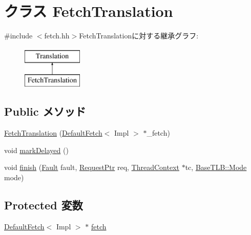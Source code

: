 \hypertarget{classDefaultFetch_1_1FetchTranslation}{
\section{クラス FetchTranslation}
\label{classDefaultFetch_1_1FetchTranslation}
}


{\ttfamily \#include $<$fetch.hh$>$}FetchTranslationに対する継承グラフ:\begin{figure}[H]
\begin{center}
\leavevmode
\includegraphics[height=2cm]{classDefaultFetch_1_1FetchTranslation}
\end{center}
\end{figure}
\subsection*{Public メソッド}
\begin{DoxyCompactItemize}
\item 
\hyperlink{classDefaultFetch_1_1FetchTranslation_a29f6356ec0deaed2e91844473a66b4ed}{FetchTranslation} (\hyperlink{classDefaultFetch}{DefaultFetch}$<$ Impl $>$ $\ast$\_\-fetch)
\item 
void \hyperlink{classDefaultFetch_1_1FetchTranslation_ad1fd11d1e352cfc4b329d29b46a19fc4}{markDelayed} ()
\item 
void \hyperlink{classDefaultFetch_1_1FetchTranslation_a01e7d945def8d2e5df87a169954fa89f}{finish} (\hyperlink{classRefCountingPtr}{Fault} fault, \hyperlink{classRequest}{RequestPtr} req, \hyperlink{classThreadContext}{ThreadContext} $\ast$tc, \hyperlink{classBaseTLB_a46c8a310cf4c094f8c80e1cb8dc1f911}{BaseTLB::Mode} mode)
\end{DoxyCompactItemize}
\subsection*{Protected 変数}
\begin{DoxyCompactItemize}
\item 
\hyperlink{classDefaultFetch}{DefaultFetch}$<$ Impl $>$ $\ast$ \hyperlink{classDefaultFetch_1_1FetchTranslation_a10f1a41fdcff6e7574a83b020d3c1a91}{fetch}
\end{DoxyCompactItemize}
